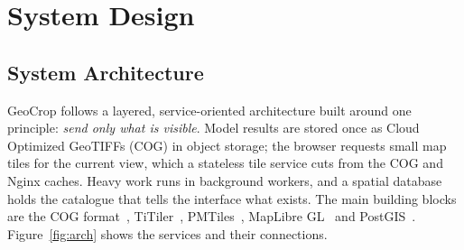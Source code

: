 \chapter{System Design}

\section{System Architecture}
GeoCrop follows a layered, service-oriented architecture built around one principle: \emph{send
only what is visible}. Model results are stored once as Cloud Optimized GeoTIFFs (COG) in object
storage; the browser requests small map tiles for the current view, which a stateless tile service
cuts from the COG and Nginx caches. Heavy work runs in background workers, and a spatial database
holds the catalogue that tells the interface what exists. The main building blocks are the COG
format~\cite{cog}, TiTiler~\cite{titiler}, PMTiles~\cite{pmtiles}, MapLibre GL~\cite{maplibre} and
PostGIS~\cite{postgis}. Figure~\ref{fig:arch} shows the services
and their connections.

